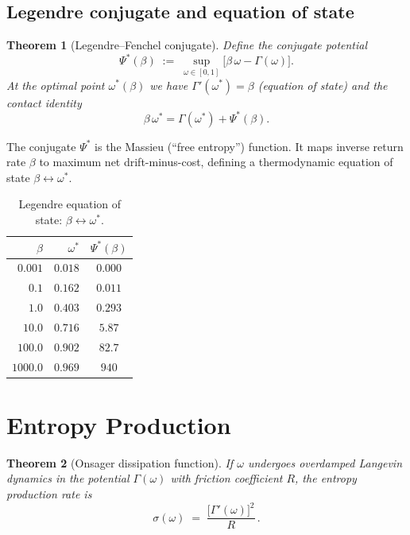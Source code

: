 \documentclass[
  aps,
  prd,
  twocolumn,
  showpacs,
  superscriptaddress,
  nofootinbib,
  floatfix
]{revtex4-2}
\newtheorem{theorem}{Theorem}
\newcommand{\Gam}{\Gamma}
\newcommand{\beq}{\begin{equation}}
\newcommand{\eeq}{\end{equation}}
\begin{document}
\subsection{Legendre conjugate and equation of state}

\begin{theorem}[Legendre--Fenchel conjugate]\label{thm:legendre}
Define the conjugate potential
\beq\label{eq:legendre}
  \Psi^{*}(\beta) \;:=\;
  \sup_{\omega\in[0,1]}
  \bigl[\beta\,\omega - \Gam(\omega)\bigr].
\eeq
At the optimal point $\omega^{*}(\beta)$ we have
$\Gam'(\omega^{*})=\beta$ (equation of state) and the
contact identity
\beq\label{eq:contact}
  \beta\,\omega^{*}
  = \Gam(\omega^{*}) + \Psi^{*}(\beta).
\eeq
\end{theorem}

The conjugate $\Psi^*$ is the Massieu (``free entropy'')
function.  It maps inverse return rate $\beta$ to maximum
net drift-minus-cost, defining a thermodynamic equation of
state $\beta\leftrightarrow\omega^*$.

\begin{table}[b]
\caption{\label{tab:eos}Legendre equation of state:
  $\beta\leftrightarrow\omega^{*}$.}
\begin{ruledtabular}
\begin{tabular}{rrc}
$\beta$ & $\omega^{*}$ & $\Psi^{*}(\beta)$ \\
\hline
$0.001$  & $0.018$ & $0.000$ \\
$0.1$    & $0.162$ & $0.011$ \\
$1.0$    & $0.403$ & $0.293$ \\
$10.0$   & $0.716$ & $5.87$ \\
$100.0$  & $0.902$ & $82.7$ \\
$1000.0$ & $0.969$ & $940$ \\
\end{tabular}
\end{ruledtabular}
\end{table}

\section{Entropy Production}\label{sec:entropy}

\begin{theorem}[Onsager dissipation function]\label{thm:entropy}
If $\omega$ undergoes overdamped Langevin dynamics in the potential
$\Gam(\omega)$ with friction coefficient $R$, the entropy production
rate is
\beq\label{eq:entropy_prod}
  \sigma(\omega) \;=\;
  \frac{\bigl[\Gam'(\omega)\bigr]^2}{R}\,.
\eeq
\end{theorem}
\end{document}
